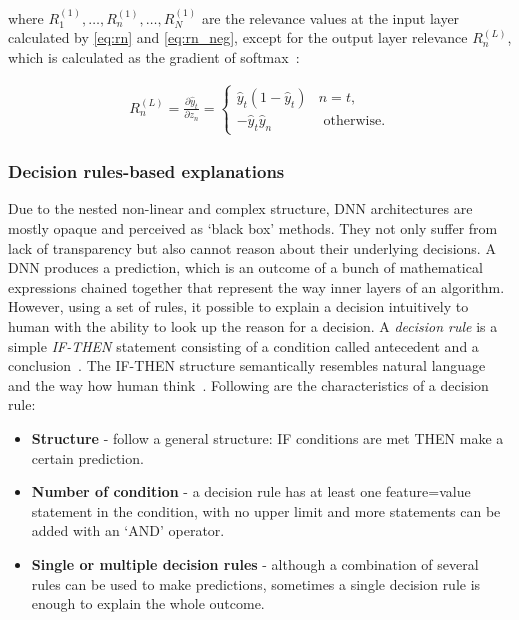 where $R_{1}^{(1)}, \ldots, R_{n}^{(1)}, \ldots, R_{N}^{(1)}$ are the relevance values at the input layer calculated by \cref{eq:rn} and \cref{eq:rn_neg}, except for the output layer relevance $R_{n}^{(L)}$, which is calculated as the gradient of softmax~\cite{LRP2}:

\vspace{-2mm}
\begin{align}
        R_{n}^{(L)}=\frac{\partial \hat{y}_{t}}{\partial z_{n}}=\left\{\begin{array}{ll}
        {\hat{y}_{t}\left(1-\hat{y}_{t}\right)} & {n=t}, \\
        {-\hat{y}_{t} \hat{y}_{n}} & {\text { otherwise.}}
    \end{array}\right.
\end{align}

\subsubsection{Decision rules-based explanations}
Due to the nested non-linear and complex structure, DNN architectures are mostly opaque and perceived as `black box' methods. They not only suffer from lack of transparency but also cannot reason about their underlying decisions. A DNN produces a prediction, which is an outcome of a bunch of mathematical expressions chained together that represent the way inner layers of an algorithm. However, using a set of rules, it possible to explain a decision intuitively to human with the ability to look up the reason for a decision. A \textit{decision rule} is a simple \textit{IF-THEN} statement consisting of a condition called antecedent and a conclusion~\cite{molnar2019interpretable}. The IF-THEN structure semantically resembles natural language and the way how human think~\cite{molnar2019interpretable}. Following are the characteristics of a decision rule: 

\begin{itemize}[noitemsep]
    \item \textbf{Structure} - follow a general structure: IF conditions are met THEN make a certain prediction. 
    \item \textbf{Number of condition} - a decision rule has at least one feature=value statement in the condition, with no upper limit and more statements can be added with an ‘AND’ operator. 
    \item \textbf{Single or multiple decision rules} - although a combination of several rules can be used to make predictions, sometimes a single decision rule is enough to explain the whole outcome.
\end{itemize}

